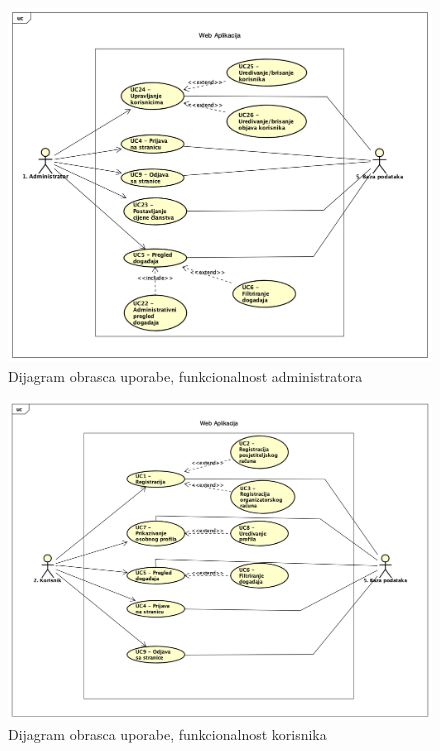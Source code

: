 					\begin{figure}[H]
						\includegraphics[scale=0.5]{dijagrami/Administrator_UC_dijagram.png} %
						\centering
						\caption{Dijagram obrasca uporabe, funkcionalnost administratora}
						\label{fig:promjene}
					\end{figure}
					
					\begin{figure}[H]
						\includegraphics[scale=0.5]{dijagrami/Korisnik_UC_dijagram.png} %
						\centering
						\caption{Dijagram obrasca uporabe, funkcionalnost korisnika}
						\label{fig:promjene}
					\end{figure}
					
